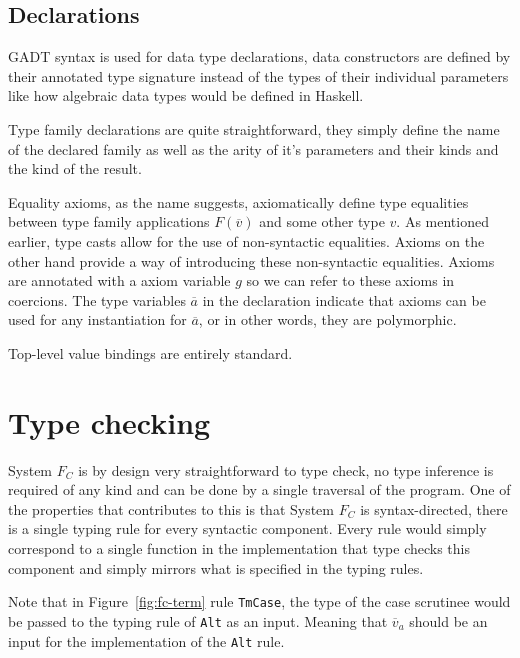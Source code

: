\subsection{Declarations}

GADT syntax is used for data type declarations, data constructors are defined by
their annotated type signature instead of the types of their individual
parameters like how algebraic data types would be defined in Haskell.

Type family declarations are quite straightforward, they simply define the name
of the declared family as well as the arity of it's parameters and their kinds
and the kind of the result.

Equality axioms, as the name suggests, axiomatically define type equalities
between type family applications $F(\overline{v})$ and some other type $v$. As
mentioned earlier, type casts allow for the use of non-syntactic equalities.
Axioms on the other hand provide a way of introducing these non-syntactic
equalities. Axioms are annotated with a axiom variable $g$ so we can refer to
these axioms in coercions. The type variables $\overline{a}$ in the declaration
indicate that axioms can be used for any instantiation for $\overline{a}$, or in
other words, they are polymorphic.

Top-level value bindings are entirely standard.


\section{Type checking}

System $F_C$ is by design very straightforward to type check, no type inference
is required of any kind and can be done by a single traversal of the program.
One of the properties that contributes to this is that System $F_C$ is
syntax-directed, there is a single typing rule for every syntactic component.
Every rule would simply correspond to a single function in the implementation
that type checks this component and simply mirrors what is specified in the
typing rules.

Note that in Figure~\ref{fig:fc-term} rule \texttt{TmCase}, the type of the case
scrutinee would be passed to the typing rule of \texttt{Alt} as an input.
Meaning that $\overline{v}_a$ should be an input for the implementation of the
\texttt{Alt} rule.

